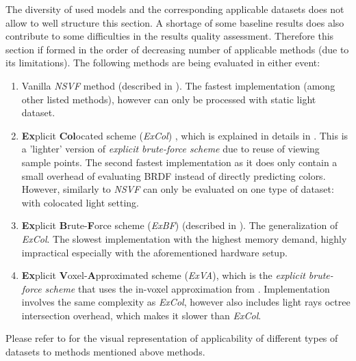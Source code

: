 The diversity of used models and the corresponding applicable datasets
does not allow to well structure this section.
A shortage of some baseline results does also contribute to some difficulties in the results quality assessment.
Therefore this section if formed in the order of decreasing number of applicable methods (due to its limitations).
The following methods are being evaluated in either event:
\begin{enumerate}
    \item Vanilla \textit{NSVF} method \cite{liu2021neural} (described in ).
    The fastest implementation (among other listed methods),
    however can only be processed with static light dataset.
    \item \textbf{Ex}plicit \textbf{Col}ocated scheme (\textit{ExCol}) \cite{bi2020neural, liu2021neural}, which is explained in details in .
    This is a 'lighter' version of \textit{explicit brute-force scheme}
    due to reuse of viewing sample points.
    The second fastest implementation as it does only contain
    a small overhead of evaluating BRDF instead of directly predicting colors.
    However, similarly to \textit{NSVF} can only be evaluated on one type of dataset: with colocated light setting.
    \item \textbf{Ex}plicit \textbf{B}rute-\textbf{F}orce scheme (\textit{ExBF}) (described in ).
    The generalization of \textit{ExCol}.
    The slowest implementation with the highest memory demand,
    highly impractical especially with the aforementioned hardware setup.
    \item \textbf{Ex}plicit \textbf{V}oxel-\textbf{A}pproximated scheme (\textit{ExVA}), which is the \textit{explicit brute-force scheme}
    that uses the in-voxel approximation from .
    Implementation involves the same complexity as \textit{ExCol},
    however also includes light rays octree intersection overhead,
    which makes it slower than \textit{ExCol}.
\end{enumerate}




Please refer to  for the visual representation of applicability of different types of datasets to methods mentioned above methods.






